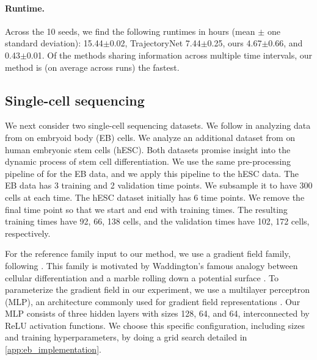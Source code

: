 \paragraph{Runtime.} Across the 10 seeds, we find the following runtimes in hours (mean $\pm$ one standard deviation): \dmsbname{} 15.44$\pm$0.02, TrajectoryNet 7.44$\pm$0.25, ours 4.67$\pm$0.66, and \vanilla{} 0.43$\pm$0.01. Of the methods sharing information across multiple time intervals, our method is (on average across runs) the fastest.

\subsection{Single-cell sequencing} 
\label{sec:scrnamain}
We next consider two single-cell sequencing datasets. We follow  \citet{tong2020trajectorynet,chen2024deep} in analyzing data from \citet{moon2019visualizing} on embryoid body (EB) cells. We analyze an additional dataset from \citet{chu2016single} on human embryonic stem cells (hESC). Both datasets promise insight into the dynamic process of stem cell differentiation. 
We use the same pre-processing pipeline of \citet{tong2020trajectorynet} for the EB data, and we apply this pipeline to the hESC data.
The EB data has 3 training and 2 validation time points. We subsample it to have 300 cells at each time.
The hESC dataset initially has 6 time points. We remove the final time point so that we start and end with training times. The resulting training times have 92, 66, 138 cells, and the validation times have 102, 172 cells, respectively.

For the reference family input to our method, we use a gradient field family, following \citet{wang2011quantifying, weinreb2018fundamental, lavenant2024toward}. This family is motivated by Waddington's famous analogy between cellular differentiation and a marble rolling down a potential surface \citep{waddington2014strategy}. 
To parameterize the gradient field in our experiment, we use a multilayer perceptron (MLP), an architecture commonly used for gradient field representations \citep[e.g.,][]{greydanus2019hamiltonian,lin2023computing}. Our MLP consists of three hidden layers with sizes 128, 64, and 64, interconnected by ReLU activation functions. We choose this specific configuration, including sizes and training hyperparameters, by doing a grid search detailed in \cref{app:eb_implementation}. 

